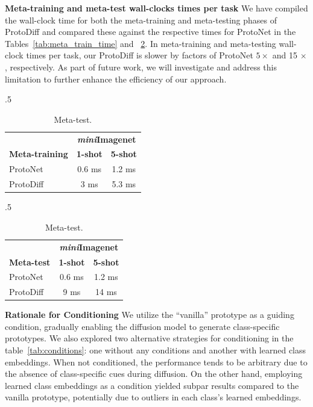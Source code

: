 \textbf{Meta-training and meta-test wall-clocks times per task}
We have compiled the wall-clock time for both the meta-training and meta-testing phases of ProtoDiff and compared these against the respective times for ProtoNet in the Tables~\ref{tab:meta_train_time} and ~\ref{tab:meta_test_time}. In meta-training and meta-testing wall-clock times per task, our ProtoDiff is slower by factors of ProtoNet $5 \times$ and 15 $\times$, respectively. As part of future work, we will investigate and address this limitation to further enhance the efficiency of our approach. 


\begin{table}[ht]
\caption{Meta-training and meta-test wall-clock times on each task.}
 \begin{subtable}{.5\linewidth}
\caption{Meta-training.}
\centering
\begin{tabular}{lcc}
\toprule 
 &  \multicolumn{2}{c}{\textbf{\textit{mini}Imagenet}}  \\
\textbf{Meta-training} & \textbf{1-shot} & \textbf{5-shot}   \\
\midrule 
ProtoNet  & 0.6 ms & 1.2 ms \\
ProtoDiff & 3 ms & 5.3 ms \\
\bottomrule
\end{tabular}
\label{tab:meta_train_time}
\end{subtable}
 \begin{subtable}{.5\linewidth}
\caption{Meta-test.}
\centering
\begin{tabular}{lcc}
\toprule 
 &  \multicolumn{2}{c}{\textbf{\textit{mini}Imagenet}}  \\
\textbf{Meta-test} & \textbf{1-shot} & \textbf{5-shot}   \\
\midrule 
ProtoNet  & 0.6 ms & 1.2 ms \\
ProtoDiff & 9 ms & 14 ms \\
\bottomrule
\end{tabular}
\label{tab:meta_test_time}
\end{subtable}
\end{table}


\textbf{Rationale for Conditioning} We utilize the “vanilla” prototype as a guiding condition, gradually enabling the diffusion model to generate class-specific prototypes. We also explored two alternative strategies for conditioning in the table~\ref{tab:conditions}: one without any conditions and another with learned class embeddings. When not conditioned, the performance tends to be arbitrary due to the absence of class-specific cues during diffusion. On the other hand, employing learned class embeddings as a condition yielded subpar results compared to the vanilla prototype, potentially due to outliers in each class's learned embeddings.


